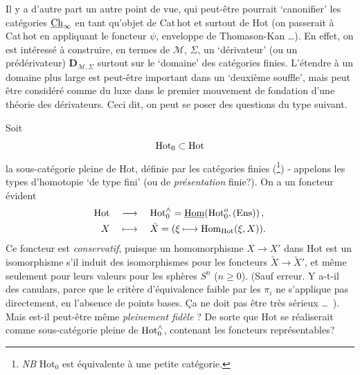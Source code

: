 Il y a d'autre part un autre point de vue, qui peut-être pourrait `canonifier' les catégories $\underline{\mathrm{Ch}}_\infty$ en tant qu'objet de Cat\,hot et surtout de Hot (on passerait à Cat\,hot en appliquant le foncteur $\psi$, enveloppe de Thomason-Kan \ldots). En effet, on est intéressé à construire, en termes de $\mathcal{M}$, $\Sigma$, un `dérivateur' (ou un prédérivateur) $\mathbf{D}_{\mathcal{M},\Sigma}$ surtout sur le `domaine' des catégories finies. L'étendre à un domaine plus large est peut-être important dans un `deuxième souffle', mais peut être considéré comme du luxe dans le premier mouvement de fondation d'une théorie des dérivateurs. Ceci dit, on peut se poser des questions du type suivant.

Soit
\[
\mathrm{Hot}_0 \subset \mathrm{Hot}
\]
la sous-catégorie pleine de Hot, définie par les catégories finies (\footnote[9]{\textit{NB} Hot$_0$ est équivalente à une petite catégorie.}) - appelons les types d'homotopie `de type fini' (ou de \textit{présentation} finie?). On a un foncteur évident
\[
\begin{aligned}
\mathrm{Hot} \quad &\longrightarrow \quad \mathrm{Hot}_0^{\wedge} = \underline{\mathrm{Hom}}(\mathrm{Hot}_0^{o}, (\mathrm{Ens})) \, ,\\
X \quad &\longmapsto \quad \tilde{X} = (\xi \longmapsto \mathrm{Hom}_{\mathrm{Hot}}(\xi, X)).
\end{aligned}
\]
Ce foncteur est \textit{conservatif}, puisque un homomorphisme $X \longrightarrow X'$ dans Hot est un isomorphisme s'il induit des isomorphismes pour les foncteurs $\tilde{X} \longrightarrow \tilde{X}'$, et même seulement pour leurs valeurs pour les sphères $S^n$ ($n \geq 0$). (Sauf erreur. Y a-t-il des canulars, parce que le critère d'équivalence faible par les $\pi_i$ ne s'applique pas directement, en l'absence de points bases. Ça ne doit pas être très sérieux \ldots\ ). Mais est-il peut-être même \textit{pleinement fidèle} ? De sorte que Hot se réaliserait comme sous-catégorie pleine de $\mathrm{Hot}_0^{\wedge}$, contenant les foncteurs représentables?


